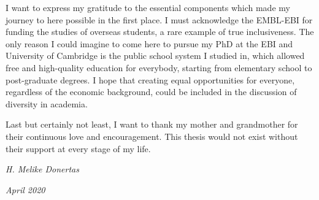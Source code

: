 \documentclass[12pt,twoside]{unicam}
\begin{document}
\begin{acknowledgements}
    \vspace{0.3cm}

    I want to express my gratitude to the essential components which made my journey to here possible in the first place. I must acknowledge the EMBL-EBI for funding the studies of overseas students, a rare example of true inclusiveness. The only reason I could imagine to come here to pursue my PhD at the EBI and University of Cambridge is the public school system I studied in, which allowed free and high-quality education for everybody, starting from elementary school to post-graduate degrees. I hope that creating equal opportunities for everyone, regardless of the economic background, could be included in the discussion of diversity in academia.

    \vspace{0.3cm}

    Last but certainly not least, I want to thank my mother and grandmother for their continuous love and encouragement. This thesis would not exist without their support at every stage of my life.

    \vspace{0.6cm}
    \begin{flushright}
    \emph{H. Melike Donertas}

    \emph{April 2020}
    \end{flushright}
  \end{acknowledgements}
\end{document}
